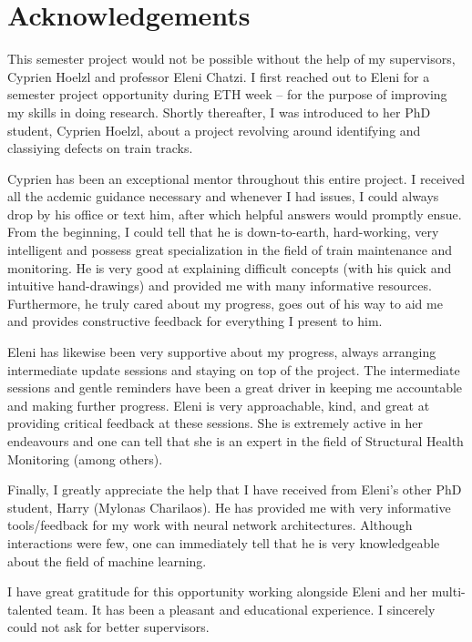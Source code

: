\newpage
\chapter*{Acknowledgements}
This semester project would not be possible without the help of my supervisors, Cyprien Hoelzl and professor Eleni Chatzi. I first reached out to Eleni for a semester project opportunity during ETH week -- for the purpose of improving my skills in doing research. Shortly thereafter, I was introduced to her PhD student, Cyprien Hoelzl, about a project revolving around identifying and classiying defects on train tracks.

Cyprien has been an exceptional mentor throughout this entire project. I received all the acdemic guidance necessary and whenever I had issues, I could always drop by his office or text him, after which helpful answers would promptly ensue. From the beginning, I could tell that he is down-to-earth, hard-working, very intelligent and possess great specialization in the field of train maintenance and monitoring. He is very good at explaining difficult concepts (with his quick and intuitive hand-drawings) and provided me with many informative resources. Furthermore, he truly cared about my progress, goes out of his way to aid me and provides constructive feedback for everything I present to him. 

Eleni has likewise been very supportive about my progress, always arranging intermediate update sessions and staying on top of the project. The intermediate sessions and gentle reminders have been a great driver in keeping me accountable and making further progress. Eleni is very approachable, kind, and great at providing critical feedback at these sessions. She is extremely active in her endeavours and one can tell that she is an expert in the field of Structural Health Monitoring (among others).

Finally, I greatly appreciate the help that I have received from Eleni's other PhD student, Harry (Mylonas Charilaos). He has provided me with very informative tools/feedback for my work with neural network architectures. Although interactions were few, one can immediately tell that he is very knowledgeable about the field of machine learning.
 
I have great gratitude for this opportunity working alongside Eleni and her multi-talented team. It has been a pleasant and educational experience. I sincerely could not ask for better supervisors.


\newpage


